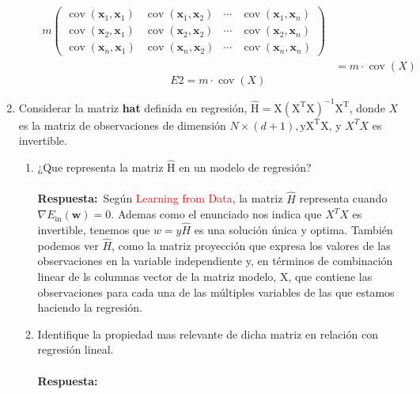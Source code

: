 \documentclass[12pt,a4paper]{article}
\begin{document}
\begin{enumerate}
\begin{enumerate}
{\begin{equation}
\begin{aligned}
		m\left( \begin{array}{cccc}{\operatorname{cov}\left(\mathbf{x}_{1}, \mathbf{x}_{1}\right)} & {\operatorname{cov}\left(\mathbf{x}_{1}, \mathbf{x}_{2}\right)} & {\cdots} & {\operatorname{cov}\left(\mathbf{x}_{1}, \mathbf{x}_{n}\right)} \\ {\operatorname{cov}\left(\mathbf{x}_{2}, \mathbf{x}_{1}\right)} & {\operatorname{cov}\left(\mathbf{x}_{2}, \mathbf{x}_{2}\right)} & {\cdots} & {\operatorname{cov}\left(\mathbf{x}_{2}, \mathbf{x}_{n}\right)} \\ {\operatorname{cov}\left(\mathbf{x}_{n}, \mathbf{x}_{1}\right)} & {\operatorname{cov}\left(\mathbf{x}_{n}, \mathbf{x}_{2}\right)} & {\cdots} & {\operatorname{cov}\left(\mathbf{x}_{n}, \mathbf{x}_{n}\right)}\end{array}\right) \\ &= m\cdot \operatorname{cov}(X)
\end{aligned}
\end{equation}}
$$
E2=m\cdot \operatorname{cov}(X)
$$
	\end{enumerate}
	\item Considerar la matriz \textbf{hat} definida en regresión, $\hat{\mathrm{H}}=\mathrm{X}\left(\mathrm{X}^{\mathrm{T}} \mathrm{X}\right)^{-1} \mathrm{X}^{\mathrm{T}}$, donde $X$ es la matriz de observaciones de dimensión $N \times(d+1), \mathrm{y} \mathrm{X}^{\mathrm{T}} \mathrm{X}$, y  $X^TX$ es invertible.
	\begin{enumerate}
		\item ¿Que representa la matriz $\hat{\mathrm{H}}$ en un modelo de regresión?\\\\
		\textbf{Respuesta:}\
			Según \textcolor{red}{Learning from Data}\cite{Abu-Mostafa:2012:LD:2207825}, la matriz $\hat{H}$ representa cuando  $\nabla E_{\mathrm{in}}(\mathbf{w}) = 0$. Ademas como el enunciado nos indica que $X^TX$ es invertible, tenemos que $w=y\hat{H}$ es una solución única y optima. También podemos ver $\hat{H}$, como la matriz proyección que expresa los valores de las observaciones en la variable independiente y, en términos de combinación linear de ls columnas vector de la matriz modelo, X, que contiene las observaciones para cada una de las múltiples variables de las que estamos haciendo la regresión.\cite{208299}
		\item Identifique la propiedad mas relevante de dicha matriz en relación con regresión lineal.\\\\\textbf{Respuesta: }\\

\end{enumerate}
\end{enumerate}
\end{document}
